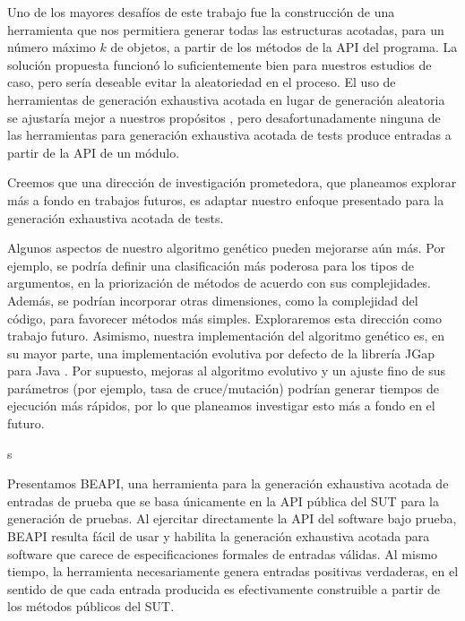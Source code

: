 Uno de los mayores desafíos de este trabajo fue la construcción de una herramienta que nos permitiera generar todas las estructuras acotadas, 
para un número máximo $k$ de objetos, a partir de los métodos de la API del programa. La solución propuesta funcionó lo suficientemente bien para nuestros estudios de caso, 
pero sería deseable evitar la aleatoriedad en el proceso. El uso de herramientas de generación exhaustiva acotada en lugar de generación aleatoria se ajustaría mejor a nuestros propósitos \cite{Boyapati02}, 
pero desafortunadamente ninguna de las herramientas para generación exhaustiva acotada de tests produce entradas a partir de la API de un módulo.

Creemos que una dirección de investigación prometedora, que planeamos explorar más a fondo en trabajos futuros, 
es adaptar nuestro enfoque presentado para la generación exhaustiva acotada de tests.

Algunos aspectos de nuestro algoritmo genético pueden mejorarse aún más. 
Por ejemplo, se podría definir una clasificación más poderosa para los tipos de argumentos, en la priorización de métodos de acuerdo con sus complejidades. Además, se podrían incorporar otras dimensiones, 
como la complejidad del código, para favorecer métodos más simples. Exploraremos esta dirección como trabajo futuro. 
Asimismo, nuestra implementación del algoritmo genético es, en su mayor parte, una implementación evolutiva por defecto de la librería JGap para Java \cite{jgrapht}. 
Por supuesto, mejoras al algoritmo evolutivo y un ajuste fino de sus parámetros (por ejemplo, tasa de cruce/mutación) podrían generar tiempos de ejecución más rápidos, 
por lo que planeamos investigar esto más a fondo en el futuro.

s

Presentamos BEAPI, una herramienta para la generación exhaustiva acotada de entradas de prueba que se basa únicamente en la API pública del SUT para la generación de pruebas. 
Al ejercitar directamente la API del software bajo prueba, BEAPI resulta fácil de usar y habilita la generación exhaustiva acotada para software que carece de especificaciones formales de entradas válidas. 
Al mismo tiempo, la herramienta necesariamente genera entradas positivas verdaderas, en el sentido de que cada entrada producida es efectivamente construible a partir de los métodos públicos del SUT.

